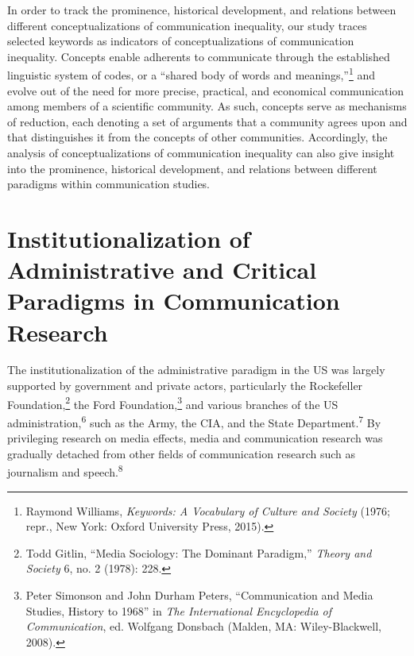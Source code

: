 \documentclass{tufte-handout}
\begin{document}
In order to track the prominence, historical development, and relations
between different conceptualizations of communication inequality, our
study traces selected keywords as indicators of conceptualizations of
communication inequality. Concepts enable adherents to communicate
through the established linguistic system of codes, or a ``shared body
of words and meanings,''\footnote{Raymond Williams, \emph{Keywords: A
  Vocabulary of Culture and Society} (1976; repr., New York: Oxford
  University Press, 2015).} and evolve out of the need for more precise,
practical, and economical communication among members of a scientific
community. As such, concepts serve as mechanisms of reduction, each
denoting a set of arguments that a community agrees upon and that
distinguishes it from the concepts of other communities. Accordingly,
the analysis of conceptualizations of communication inequality can also
give insight into the prominence, historical development, and relations
between different paradigms within communication studies.

\hypertarget{institutionalization-of-administrative-and-critical-paradigms-in-communication-research}{%
\section{Institutionalization of Administrative and Critical
Paradigms in Communication
Research}\label{institutionalization-of-administrative-and-critical-paradigms-in-communication-research}}

The institutionalization of the administrative paradigm in the US was
largely supported by government and private actors, particularly the
Rockefeller Foundation,\footnote{Todd Gitlin, ``Media Sociology: The
  Dominant Paradigm,'' \emph{Theory and Society} 6, no. 2 (1978): 228.}
the Ford Foundation,\footnote{Peter Simonson and John Durham Peters,
  ``Communication and Media Studies, History to 1968'' in \emph{The
  International Encyclopedia of Communication}, ed. Wolfgang Donsbach
  (Malden, MA: Wiley-Blackwell, 2008).} and various branches of the US
administration,\textsuperscript{6} such
as the Army, the CIA, and the State Department.\textsuperscript{7} By privileging research on media effects, media and
communication research was gradually detached from other fields of
communication research such as journalism and speech.\textsuperscript{8}

\newpage
\end{document}
